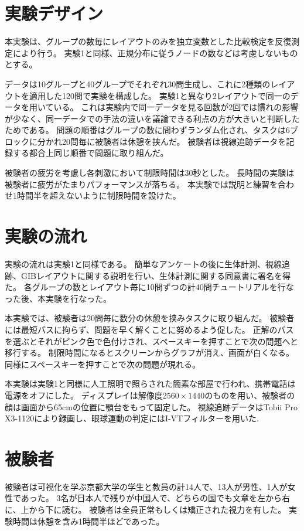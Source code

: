 \documentclass{kuee}
\begin{document}
\section{実験デザイン}
\label{sec:ex2-design}
本実験は、グループの数毎にレイアウトのみを独立変数とした比較検定を反復測定により行う。
実験1と同様、正規分布に従うノードの数などは考慮しないものとする。

データは10グループと40グループでそれぞれ30問生成し、これに2種類のレイアウトを適用した120問で実験を構成した。
実験1と異なり2レイアウトで同一のデータを用いている。
これは実験内で同一データを見る回数が2回では慣れの影響が少なく、同一データでの手法の違いを議論できる利点の方が大きいと判断したためである。
問題の順番はグループの数に問わずランダム化され、タスクは6ブロックに分かれ20問毎に被験者は休憩を挟んだ。
被験者は視線追跡データを記録する都合上同じ順番で問題に取り組んだ。

被験者の疲労を考慮し各刺激において制限時間は30秒とした。
長時間の実験は被験者に疲労がたまりパフォーマンスが落ちる。
本実験では説明と練習を合わせ1時間半を超えないように制限時間を設けた。

\section{実験の流れ}
実験の流れは実験1と同様である。
簡単なアンケートの後に生体計測、視線追跡、GIBレイアウトに関する説明を行い、生体計測に関する同意書に署名を得た。
各グループの数とレイアウト毎に10問ずつの計40問チュートリアルを行なった後、本実験を行なった。

本実験では、被験者は20問毎に数分の休憩を挟みタスクに取り組んだ。
被験者には最短パスに拘らず、問題を早く解くことに努めるよう促した。
正解のパスを選ぶとそれがピンク色で色付けされ、スペースキーを押すことで次の問題へと移行する。
制限時間になるとスクリーンからグラフが消え、画面が白くなる。
同様にスペースキーを押すことで次の問題が現れる。

本実験は実験1と同様に人工照明で照らされた簡素な部屋で行われ、携帯電話は電源をオフにした。
ディスプレイは解像度$2560 \times 1440$のものを用い、被験者の顔は画面から65cmの位置に顎台をもって固定した。
視線追跡データはTobii Pro X3-1120により録画し、眼球運動の判定にはI-VTフィルター\cite{olsen2012tobii}を用いた.

\section{被験者}
被験者は可視化を学ぶ京都大学の学生と教員の計14人で、13人が男性、1人が女性であった。
3名が日本人で残りが中国人で、どちらの国でも文章を左から右に、上から下に読む。
被験者は全員正常もしくは矯正された視力を有した。
実験時間は休憩を含み1時間半ほどであった。
\end{document}
